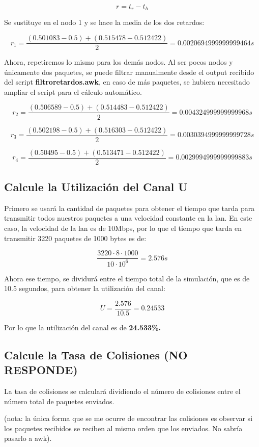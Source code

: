 \documentclass{article}
\begin{document}
\[r = t_r - t_h\]

Se sustituye en el nodo 1 y se hace la media de los dos retardos:

\[
	r_{1} = \frac{(0.501083 - 0.5) + (0.515478 - 0.512422)}{2} = 0.0020694999999999464s
\]

Ahora, repetiremos lo mismo para los demás nodos. Al ser pocos nodos y únicamente dos paquetes, se puede filtrar manualmente desde el output recibido del script \textbf{filtroretardos.awk}, en caso de más paquetes, se hubiera necesitado ampliar el script para el cálculo automático.

\[
	r_{2} = \frac{(0.506589 - 0.5) + (0.514483 - 0.512422)}{2} = 0.004324999999999968s
\]

\[
	r_{3} = \frac{(0.502198 - 0.5) + (0.516303 - 0.512422)}{2} = 0.0030394999999999728s
\]

\[
	r_{4} = \frac{(0.50495 - 0.5) + (0.513471 - 0.512422)}{2} = 0.0029994999999999883s
\]

\subsection{Calcule la Utilización del Canal U}

Primero se usará la cantidad de paquetes para obtener el tiempo que tarda para transmitir todos nuestros paquetes a una velocidad constante en la lan. En este caso, la velocidad de la lan es de 10Mbps, por lo que el tiempo que tarda en transmitir 3220 paquetes de 1000 bytes es de:

\[
    \frac{3220 \cdot 8 \cdot 1000}{10 \cdot 10^6} = 2.576s
\]

Ahora ese tiempo, se dividurá entre el tiempo total de la simulación, que es de 10.5 segundos, para obtener la utilización del canal:

\[
    U = \frac{2.576}{10.5} = 0.24533
\]

Por lo que la utilización del canal es de \textbf{24.533\%.}

\subsection{Calcule la Tasa de Colisiones (NO RESPONDE)}

La tasa de colisiones se calculará dividiendo el número de colisiones entre el número total de paquetes enviados.

(nota: la única forma que se me ocurre de encontrar las colisiones es observar si los paquetes recibidos se reciben al mismo orden que los enviados. No sabría pasarlo a awk).
\end{document}

